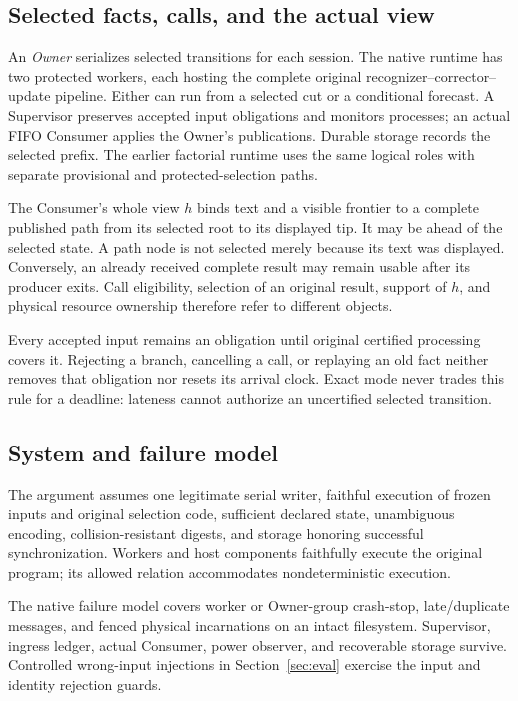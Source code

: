 \subsection{Selected facts, calls, and the actual view}
An \emph{Owner} serializes selected transitions for each session. The
native runtime has two protected workers, each hosting the complete
original recognizer--corrector--update pipeline. Either can run from a
selected cut or a conditional forecast. A Supervisor preserves accepted
input obligations and monitors processes; an actual FIFO Consumer applies
the Owner's publications. Durable storage records the selected prefix.
The earlier factorial runtime uses the same logical roles with separate
provisional and protected-selection paths.

The Consumer's whole view $h$ binds text and a visible frontier to a
complete published path from its selected root to its displayed tip.
It may be ahead of the selected state. A path node is not selected merely
because its text was displayed. Conversely, an already received complete
result may remain usable after its producer exits. Call eligibility,
selection of an original result, support of $h$, and physical resource
ownership therefore refer to different objects.

Every accepted input remains an obligation until original certified
processing covers it. Rejecting a branch, cancelling a call, or replaying
an old fact neither removes that obligation nor resets its arrival
clock. Exact mode never trades this rule for a deadline: lateness cannot
authorize an uncertified selected transition.

\subsection{System and failure model}\label{subsec:failure_model}
The argument assumes one legitimate serial writer, faithful execution of
frozen inputs and original selection code, sufficient declared state,
unambiguous encoding, collision-resistant digests, and storage honoring
successful synchronization. Workers and host components faithfully
execute the original program; its allowed relation accommodates
nondeterministic execution.

The native failure model covers worker or Owner-group crash-stop,
late/duplicate messages, and fenced physical incarnations on an intact
filesystem. Supervisor, ingress ledger, actual Consumer, power observer,
and recoverable storage survive. Controlled wrong-input injections in
Section~\ref{sec:eval} exercise the input and identity rejection guards.
